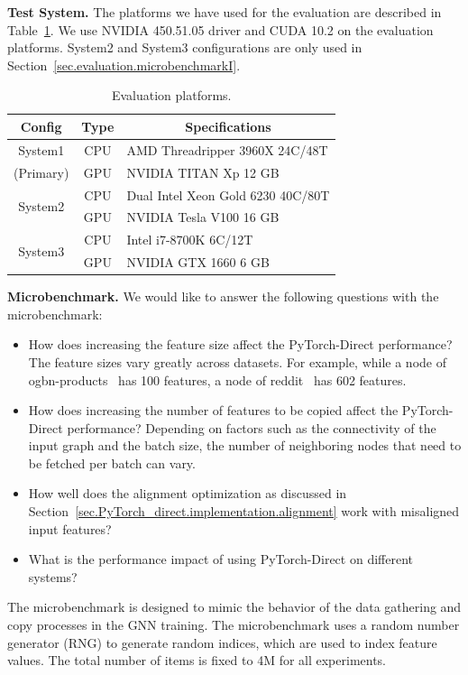 \noindent\textbf{Test System.} The platforms we have used for the evaluation are described in Table~\ref{tab:hardware}.
We use NVIDIA 450.51.05 driver and CUDA 10.2 on the evaluation platforms.
System2 and System3 configurations are only used in Section~\ref{sec.evaluation.microbenchmarkI}.

\begin{table}[]
\centering
            \begin{tabular}{ccl}
                \toprule
                Config                   & Type & \multicolumn{1}{c}{Specifications} \\
                \midrule
                System1                  & CPU  & AMD Threadripper 3960X 24C/48T    \\
                (Primary)                & GPU  & NVIDIA TITAN Xp 12 GB              \\
                \midrule
                \multirow{2}{*}{System2} & CPU  & Dual Intel Xeon Gold 6230 40C/80T \\
                                         & GPU  & NVIDIA Tesla V100 16 GB            \\
                \midrule
                \multirow{2}{*}{System3} & CPU  & Intel i7-8700K 6C/12T             \\
                                         & GPU  & NVIDIA GTX 1660 6 GB               \\
                \bottomrule
            \end{tabular}
    \caption{Evaluation platforms. }
    \label{tab:hardware}
\end{table}


\noindent\textbf{Microbenchmark.} We would like to answer the following questions with the microbenchmark:

\begin{itemize}
    \item How does increasing the feature size affect the PyTorch-Direct performance? The feature sizes vary greatly across datasets. For example, while a node of ogbn-products~\cite{huOpenGraphBenchmark2021} has 100 features, a node of reddit~\cite{hamilton2017inductive} has 602 features.
    \item How does increasing the number of features to be copied affect the PyTorch-Direct performance? Depending on factors such as the connectivity of the input graph and the batch size, the number of neighboring nodes that need to be fetched per batch can vary.
    \item How well does the alignment optimization as discussed in Section~\ref{sec.PyTorch_direct.implementation.alignment} work with misaligned input features?
    \item What is the performance impact of using PyTorch-Direct on different systems?
\end{itemize}
The microbenchmark is designed to mimic the behavior of the data gathering and copy processes in the GNN training.
The microbenchmark uses a random number generator (RNG) to generate random indices, which are used to index feature values.
The total number of items is fixed to 4M for all experiments.

